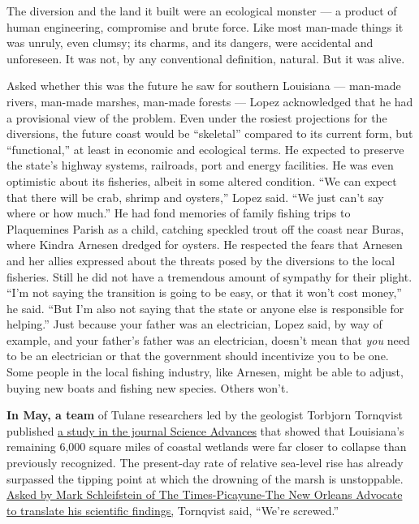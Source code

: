 The diversion and the land it built were an ecological monster --- a
product of human engineering, compromise and brute force. Like most
man-made things it was unruly, even clumsy; its charms, and its dangers,
were accidental and unforeseen. It was not, by any conventional
definition, natural. But it was alive.

Asked whether this was the future he saw for southern Louisiana ---
man-made rivers, man-made marshes, man-made forests --- Lopez
acknowledged that he had a provisional view of the problem. Even under
the rosiest projections for the diversions, the future coast would be
``skeletal'' compared to its current form, but ``functional,'' at least
in economic and ecological terms. He expected to preserve the state's
highway systems, railroads, port and energy facilities. He was even
optimistic about its fisheries, albeit in some altered condition. ``We
can expect that there will be crab, shrimp and oysters,'' Lopez said.
``We just can't say where or how much.'' He had fond memories of family
fishing trips to Plaquemines Parish as a child, catching speckled trout
off the coast near Buras, where Kindra Arnesen dredged for oysters. He
respected the fears that Arnesen and her allies expressed about the
threats posed by the diversions to the local fisheries. Still he did not
have a tremendous amount of sympathy for their plight. ``I'm not saying
the transition is going to be easy, or that it won't cost money,'' he
said. ``But I'm also not saying that the state or anyone else is
responsible for helping.'' Just because your father was an electrician,
Lopez said, by way of example, and your father's father was an
electrician, doesn't mean that \emph{you} need to be an electrician or
that the government should incentivize you to be one. Some people in the
local fishing industry, like Arnesen, might be able to adjust, buying
new boats and fishing new species. Others won't.

\textbf{In May, a team} of Tulane researchers led by the geologist
Torbjorn Tornqvist published
\href{https://advances.sciencemag.org/content/6/21/eaaz5512}{a study in
the journal Science Advances} that showed that Louisiana's remaining
6,000 square miles of coastal wetlands were far closer to collapse than
previously recognized. The present-day rate of relative sea-level rise
has already surpassed the tipping point at which the drowning of the
marsh is unstoppable.
\href{https://www.nola.com/news/environment/article_577f61aa-9c26-11ea-8800-0707002d333a.html}{Asked
by Mark Schleifstein of The Times-Picayune-The New Orleans Advocate to
translate his scientific findings,} Tornqvist said, ``We're screwed.''

